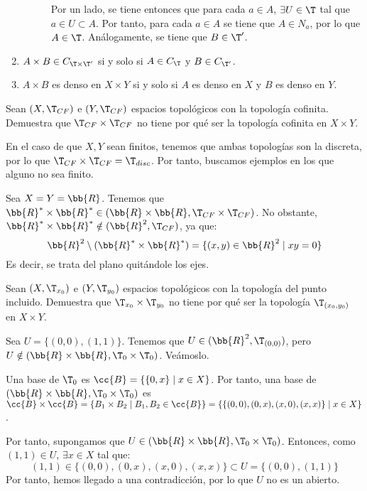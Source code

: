 \begin{ejercicio}
\begin{enumerate}
\begin{description}
            Por un lado, se tiene entonces que para cada $a\in A$, $\exists U\in \T$ tal que $a\in U\subset A$. Por tanto, para cada $a\in A$ se tiene que $A\in N_a$, por lo que $A\in \T$. Análogamente, se tiene que $B\in \T'$.
        \end{description}
        \item $A \times B \in C_{\T \times \T'}$ si y solo si $A \in C_\T$ y $B \in C_{\T'}$.


        \item $A \times B$ es denso en $X \times Y$ si y solo si $A$ es denso en $X$ y $B$ es denso en $Y$.
    \end{enumerate}
\end{ejercicio}

\begin{ejercicio}
    Sean $(X, \T_{CF})$ e $(Y, \T_{CF})$ espacios topológicos con la topología cofinita. Demuestra que $\T_{CF}\times \T_{CF}$ no tiene por qué ser la topología cofinita en $X \times Y$.

    En el caso de que $X,Y$ sean finitos, tenemos que ambas topologías son la discreta, por lo que $\T_{CF}\times \T_{CF}=\T_{disc}$. Por tanto, buscamos ejemplos en los que alguno no sea finito.

    Sea $X=Y=\bb{R}$. Tenemos que $\bb{R}^\ast\times \bb{R}^\ast \in (\bb{R}\times \bb{R}, \T_{CF}\times \T_{CF})$. No obstante, $\bb{R}^\ast\times \bb{R}^\ast \notin (\bb{R}^2, \T_{CF})$, ya que:
    \begin{equation*}
        \bb{R}^2\setminus (\bb{R}^\ast\times \bb{R}^\ast) = \{(x,y)\in \bb{R}^2 \mid xy= 0\}
    \end{equation*}
    Es decir, se trata del plano quitándole los ejes.
\end{ejercicio}


\begin{ejercicio}
    Sean $(X, \T_{x_0})$ e $(Y, \T_{y_0})$ espacios topológicos con la topología del punto incluido. Demuestra que $\T_{x_0} \times \T_{y_0}$ no tiene por qué ser la topología $\T_{(x_0,y_0)}$ en $X \times Y$.

    Sea $U=\{(0,0), (1,1)\}$. Tenemos que $U\in (\bb{R}^2, \T_{(0,0)})$, pero $U\notin (\bb{R}\times \bb{R}, \T_0\times \T_0)$. Veámoslo.

    Una base de $\T_0$ es $\cc{B}=\{\{0,x\}\mid x\in X\}$. Por tanto, una base de $(\bb{R}\times \bb{R}, \T_0\times \T_0)$ es $\cc{B}\times \cc{B} = \{B_1\times B_2\mid B_1,B_2\in \cc{B}\} = \{\{(0,0), (0,x), (x,0), (x,x)\}\mid x\in X\}$.

    Por tanto, supongamos que $U\in (\bb{R}\times \bb{R}, \T_0\times \T_0)$. Entonces, como $(1,1)\in U$, $\exists x\in X$ tal que:
    \begin{equation*}
        (1,1)\in \{(0,0), (0,x), (x,0), (x,x)\}\subset U=\{(0,0), (1,1)\}
    \end{equation*}
    Por tanto, hemos llegado a una contradicción, por lo que $U$ no es un abierto.

    
\end{ejercicio}


